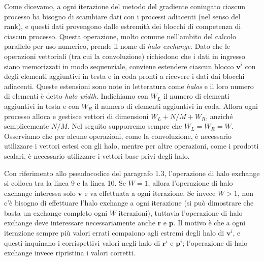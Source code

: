 \documentclass[a4paper,11pt]{article}
\renewcommand{\vec}[1]{\bm{#1}}
\begin{document}
Come dicevamo, a ogni iterazione del metodo del gradiente
coniugato ciascun processo ha bisogno di scambiare dati
con i processi adiacenti (nel senso del rank),
e questi dati provengono dalle estremità dei blocchi
di competenza di ciascun processo. Questa operazione,
molto comune nell'ambito del calcolo parallelo per uso
numerico, prende il nome di \emph{halo exchange}.
%
Dato che le operazioni vettoriali (tra cui la convoluzione)
richiedono che i dati in ingresso siano memorizzati in
modo sequenziale, conviene estendere ciascun blocco $\vec{v}^i$ con
degli elementi aggiuntivi in testa e in coda
pronti a ricevere i dati dai blocchi adiacenti.
Queste estensioni sono note in letteratura come \emph{halos}
e il loro numero di elementi è detto \emph{halo width}.
Indichiamo con $W_L$ il numero di elementi aggiuntivi in testa
e con $W_R$ il numero di elementi aggiuntivi in coda.
Allora ogni processo alloca e gestisce vettori di dimensioni
$W_L + N/M + W_R$, anziché semplicemente $N/M$.
Nel seguito supporremo sempre che $W_L = W_R = W$.
Osserviamo che per alcune operazioni, come la convoluzione, è
necessario utilizzare i vettori estesi con gli halo,
mentre per altre operazioni, come i prodotti scalari,
è necessario utilizzare i vettori base privi degli halo.

Con riferimento allo pseudocodice del paragrafo 1.3,
l'operazione di halo exchange si colloca tra la linea 9 e
la linea 10. Se $W = 1$, allora l'operazione di
halo exchange interessa solo $\vec{v}$ e
va effettuata a ogni iterazione. Se invece $W > 1$,
non c'è bisogno di effettuare l'halo exchange a ogni
iterazione (si può dimostrare che basta un exchange
completo ogni $W$ iterazioni), tuttavia l'operazione
di halo exchange deve interessare necessariamente
anche $\vec{r}$ e $\vec{p}$.
Il motivo è che a ogni iterazione sempre più valori errati
compaiono agli estremi degli halo di $\vec{v}^i$,
e questi inquinano i corrispettivi valori negli halo
di $\vec{r}^i$ e $\vec{p}^i$; l'operazione di halo exchange
invece ripristina i valori corretti.
\end{document}
